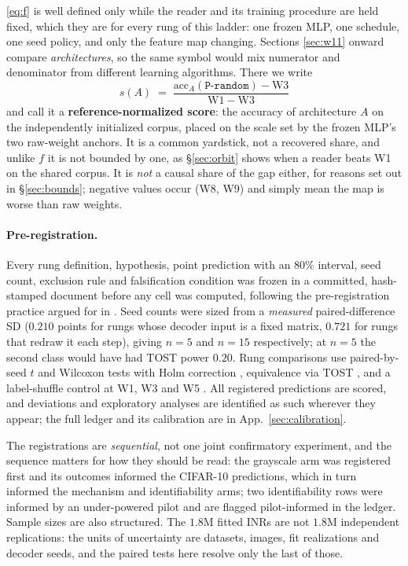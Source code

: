 \documentclass[10pt,twocolumn,letterpaper]{article}
\theoremstyle{definition}
\begin{document}
\eqref{eq:f} is well defined only while the reader and its training procedure are held fixed, which
they are for every rung of this ladder: one frozen MLP, one schedule, one seed policy, and only the
feature map changing. Sections \ref{sec:w11} onward compare \emph{architectures}, so the same
symbol would mix numerator and denominator from different learning algorithms. There we write
\begin{equation}
s(A) \;=\; \frac{\mathrm{acc}_A(\texttt{P-random}) - \mathrm{W3}}{\mathrm{W1} - \mathrm{W3}}
\label{eq:s}
\end{equation}
and call it a \textbf{reference-normalized score}: the accuracy of architecture $A$ on the
independently initialized corpus, placed on the scale set by the frozen MLP's two raw-weight
anchors. It is a common yardstick, not a recovered share, and unlike $f$ it is not bounded by one,
as \S\ref{sec:orbit} shows when a reader beats W1 on the shared corpus. It is \emph{not} a causal
share of the gap either, for
reasons set out in \S\ref{sec:bounds}; negative values occur (W8, W9) and simply mean the map is
worse than raw weights.

\paragraph{Pre-registration.} Every rung definition, hypothesis, point prediction with an $80\%$
interval, seed count, exclusion rule and falsification condition was frozen in a committed,
hash-stamped document before any cell was computed, following the pre-registration practice
argued for in \citep{munafo2017manifesto,nosek2018preregistration}. Seed counts were sized from a
\emph{measured} paired-difference SD ($0.210$ points for rungs whose decoder input is a fixed
matrix, $0.721$ for rungs that redraw it each step), giving $n=5$ and $n=15$ respectively;
at $n=5$ the second class would have had TOST power $0.20$. Rung comparisons use paired-by-seed
$t$ and Wilcoxon tests with Holm correction \citep{holm1979simple}, equivalence via TOST
\citep{schuirmann1987tost}, and a label-shuffle control at W1, W3 and W5
\citep{zhang2017rethinking}. All registered predictions are scored, and deviations and exploratory
analyses are identified as such wherever they appear; the full ledger and its calibration are in
App.~\ref{sec:calibration}.

The registrations are \emph{sequential}, not one joint confirmatory experiment, and the sequence
matters for how they should be read: the grayscale arm was registered first and its outcomes
informed the CIFAR-10 predictions, which in turn informed the mechanism and identifiability arms;
two identifiability rows were informed by an under-powered pilot and are flagged pilot-informed in
the ledger. Sample sizes are also structured. The $1.8$M fitted INRs are not $1.8$M independent
replications: the units of uncertainty are datasets, images, fit realizations and decoder seeds,
and the paired tests here resolve only the last of those.
\end{document}
